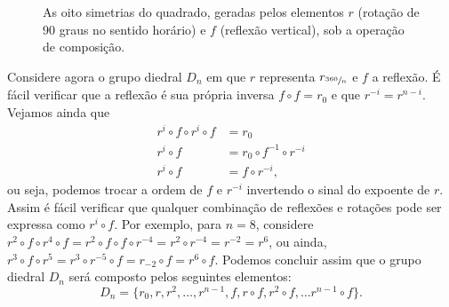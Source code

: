 \begin{example}
\begin{figure}[h]
\caption{As oito simetrias do quadrado, geradas pelos elementos $r$ (rotação de 90 graus no sentido horário) e $f$ (reflexão vertical), sob a operação de composição.}
\label{fig:square_symmetries}
\end{figure}
\end{example}



\begin{example}
  Considere agora o grupo diedral $D_n$ em que $r$ representa $r_{\sfrac{360}{n}}$
  e $f$ a reflexão. É fácil verificar que a reflexão é sua própria inversa $f \circ f = r_0$
  e que $r^{-i} = r^{n-i}$. Vejamos ainda que
  \begin{subequations}
    \begin{align}
      r^i \circ f \circ r^i \circ f &= r_0 \\
      r^i \circ f &= r_0 \circ f^{-1} \circ r^{-i} \\
      r^i \circ f &= f \circ r^{-i},
    \end{align}
  \end{subequations}
  ou seja, podemos trocar a ordem de $f$ e  $r^{-i}$ invertendo o sinal do expoente de $r$.
  Assim é fácil verificar que qualquer combinação de reflexões e rotações
  pode ser expressa como $r^i \circ f$. Por exemplo, para $n=8$, considere
  $r^2 \circ f \circ r^4 \circ f = r^2 \circ f \circ f \circ r^{-4} = r^2 \circ r^{-4} = r^{-2} = r^6$,
  ou ainda, $r^3 \circ f \circ r^5 = r^3 \circ r^{-5} \circ f = r_{-2} \circ f = r^6 \circ f$.
  Podemos concluir assim que o grupo diedral $D_n$ será composto pelos seguintes elementos:
  \begin{equation}
    D_n = \{r_0, r, r^2, \ldots, r^{n-1}, f, r \circ f, r^2 \circ f, \ldots r^{n-1} \circ f\} .
  \end{equation}
\end{example}




